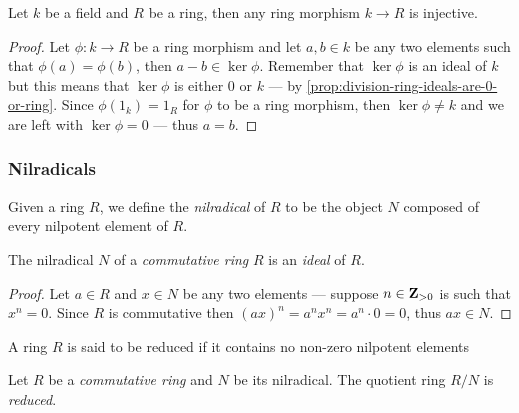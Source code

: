 \begin{proposition}
\label{prop:morphism-field-to-ring-is-injective}
Let \(k\) be a field and \(R\) be a ring, then any ring morphism \(k \to R\) is
injective.
\end{proposition}

\begin{proof}
Let \(\phi: k \to R\) be a ring morphism and let \(a, b \in k\) be any two
elements such that \(\phi(a) = \phi(b)\), then \(a - b \in \ker \phi\). Remember
that \(\ker \phi\) is an ideal of \(k\) but this means that \(\ker \phi\) is
either \(0\) or \(k\) --- by
\cref{prop:division-ring-ideals-are-0-or-ring}. Since \(\phi(1_k) = 1_R\) for
\(\phi\) to be a ring morphism, then \(\ker \phi \neq k\) and we are left with
\(\ker \phi = 0\) --- thus \(a = b\).
\end{proof}

\subsubsection{Nilradicals}

\begin{definition}[Nilradical]
\label{def:nilradical}
Given a ring \(R\), we define the \emph{nilradical} of \(R\)
to be the object \(N\) composed of every nilpotent element of \(R\).
\end{definition}

\begin{corollary}
\label{cor:nilradical-is-ideal}
The nilradical \(N\) of a \emph{commutative ring} \(R\) is an \emph{ideal} of
\(R\).
\end{corollary}

\begin{proof}
Let \(a \in R\) and \(x \in N\) be any two elements --- suppose \(n \in
\mathbf{Z}_{>0}\) is such that \(x^n = 0\). Since \(R\) is commutative then \((a x)^n =
a^n x^n = a^n \cdot 0 = 0\), thus \(a x \in N\).
\end{proof}

\begin{definition}
\label{def:reduced-ring}
A ring \(R\) is said to be reduced if it contains no non-zero nilpotent elements
\end{definition}

\begin{corollary}
\label{cor:reducing-with-nilradical}
Let \(R\) be a \emph{commutative ring} and \(N\) be its nilradical. The quotient
ring \(R/N\) is \emph{reduced}.
\end{corollary}

